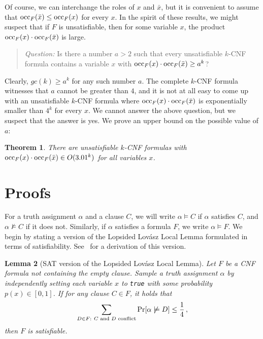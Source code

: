\documentclass[a4paper, 11pt]{article}
\newtheorem{theorem}{Theorem}\newtheorem{proposition}[theorem]{Proposition}
\newtheorem{lemma}[theorem]{Lemma}
\newcommand{\occ}{\ensuremath{{\rm{occ}}}}
\begin{document}
Of course, we can interchange the
roles of $x$ and $\bar{x}$, but it is convenient to assume that
$\occ_F(\bar{x}) \leq \occ_F(x)$ for every $x$.
In the spirit of these
results, we might suspect that if $F$ is unsatisfiable, then for some
variable $x$, the product  $\occ_F(x) \cdot \occ_F(\bar{x})$ is large.

\begin{quotation}
  {\em Question:} Is there a number $a > 2$ such that every unsatisfiable
  $k$-CNF formula contains a variable $x$ with 
  $\occ_F(x) \cdot \occ_F(\bar{x}) \geq a^k$?
\end{quotation}

Clearly, $gc(k) \geq a^k$ for any such number $a$. The complete
$k$-CNF formula witnesses that $a$ cannot be greater than $4$, and it
is not at all easy to come up with an unsatisfiable $k$-CNF formula
where $\occ_F(x)\cdot\occ_F(\bar{x})$ is exponentially smaller than
$4^k$ for every $x$. We cannot answer the above question, but we
suspect that the answer is yes. We prove an upper bound on the
possible value of $a$:

\begin{theorem}
  There are unsatisfiable $k$-CNF formulas with $\occ_F(x) \cdot
  \occ_F(\bar{x}) \in O(3.01^k)$ for all variables $x$.
\label{theorem-individual}
\end{theorem}



\section{Proofs}\label{section-proofs}

For a truth assignment $\alpha$ and a clause $C$, we will write
$\alpha \models C$ if $\alpha$ satisfies $C$, and $\alpha\not\models
C$ if it does not.  Similarly, if $\alpha$ satisfies a formula $F$, we
write $\alpha \models F$. We begin by stating a version of the
Lopsided Lov\'asz Local Lemma formulated in terms of satisfiability.
See~\cite{SZ2008} for a derivation of this version.

\begin{lemma}[SAT version of the Lopsided Lov\'asz Local Lemma]
  Let $F$ be a CNF formula not containing the empty clause.  Sample a
  truth assignment $\alpha$ by independently setting each variable $x$
  to {\em \texttt{true}} with some probability $p(x) \in [0,1]$.  If
  for any clause $C \in F$, it holds that
 \begin{eqnarray}
   \sum_{D \in F:\ C\textnormal{ and } D \textnormal{ conflict}} \Pr[\alpha 
   \not \models D] \leq \frac{1}{4}\,,
   \label{ineq-sum}
 \end{eqnarray}
 then $F$ is satisfiable.
\label{corollary-llll}
\end{lemma}
\end{document}
